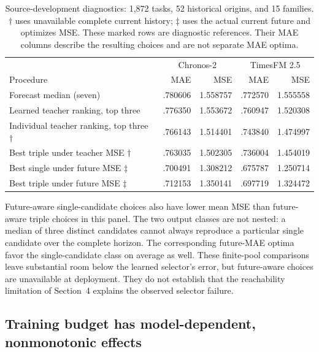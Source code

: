 \documentclass{article}
\begin{document}
\begin{table}[t]
\centering\small
\caption{Source-development diagnostics: 1,872 tasks, 52 historical origins, and 15 families. $\dagger$ uses unavailable complete current history; $\ddagger$ uses the actual current future and optimizes MSE. These marked rows are diagnostic references. Their MAE columns describe the resulting choices and are not separate MAE optima.}
\label{tab:objective-gap}
\begin{tabular}{lrrrr}
\toprule
 & \multicolumn{2}{c}{Chronos-2} & \multicolumn{2}{c}{TimesFM 2.5}\\
Procedure & MAE & MSE & MAE & MSE\\
\midrule
Forecast median (seven) & .780606 & 1.558757 & .772570 & 1.555558\\
Learned teacher ranking, top three & .776350 & 1.553672 & .760947 & 1.520308\\
Individual teacher ranking, top three $\dagger$ & .766143 & 1.514401 & .743840 & 1.474997\\
Best triple under teacher MSE $\dagger$ & .763035 & 1.502305 & .736004 & 1.454019\\
Best single under future MSE $\ddagger$ & .700491 & 1.308212 & .675787 & 1.250714\\
Best triple under future MSE $\ddagger$ & .712153 & 1.350141 & .697719 & 1.324472\\
\bottomrule
\end{tabular}
\end{table}

Future-aware single-candidate choices also have lower mean MSE than future-aware triple choices in this panel. The two output classes are not nested: a median of three distinct candidates cannot always reproduce a particular single candidate over the complete horizon. The corresponding future-MAE optima favor the single-candidate class on average as well. These finite-pool comparisons leave substantial room below the learned selector's error, but future-aware choices are unavailable at deployment. They do not establish that the reachability limitation of Section~4 explains the observed selector failure.

\subsection{Training budget has model-dependent, nonmonotonic effects}
\end{document}

